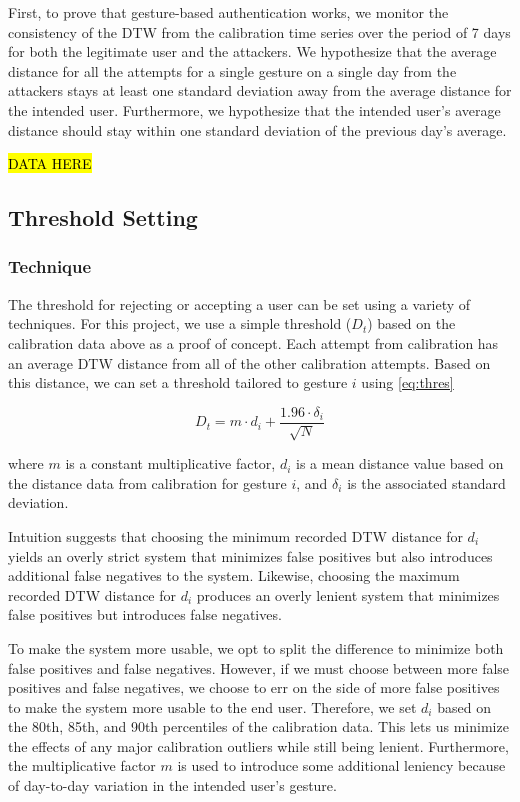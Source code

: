 First, to prove that gesture-based authentication works, we monitor the consistency of the \gls{DTW} from the calibration time series over the period of 7 days for both the legitimate user and the attackers. We hypothesize that the average distance for all the attempts for a single gesture on a single day from the attackers stays at least one standard deviation away from the average distance for the intended user. Furthermore, we hypothesize that the intended user's average distance should stay within one standard deviation of the previous day's average.

\hl{DATA HERE}

\subsection{Threshold Setting}

\subsubsection{Technique}

The threshold for rejecting or accepting a user can be set using a variety of techniques. For this project, we use a simple threshold ($D_{t}$) based on the calibration data above as a proof of concept. Each attempt from calibration has an average \gls{DTW} distance from all of the other calibration attempts. Based on this distance, we can set a threshold tailored to gesture $i$ using \autoref{eq:thres}

\begin{equation}
D_{t} = m \cdot d_{i} + \frac{1.96 \cdot \delta_{i}}  {\sqrt{N}}
\label{eq:thres}
\end{equation}

\noindent where $m$ is a constant multiplicative factor, $d_{i}$ is a mean distance value based on the distance data from calibration for gesture $i$, and $\delta_{i}$ is the associated standard deviation.

Intuition suggests that choosing the minimum recorded \gls{DTW} distance for $d_{i}$ yields an overly strict system that minimizes false positives but also introduces additional false negatives to the system. Likewise, choosing the maximum recorded \gls{DTW} distance for $d_{i}$ produces an overly lenient system that minimizes false positives but introduces false negatives. 

To make the system more usable, we opt to split the difference to minimize both false positives and false negatives. However, if we must choose between more false positives and false negatives, we choose to err on the side of more false positives to make the system more usable to the end user. Therefore, we set $d_{i}$ based on the 80th, 85th, and 90th percentiles of the calibration data. This lets us minimize the effects of any major calibration outliers while still being lenient. Furthermore, the multiplicative factor $m$ is used to introduce some additional leniency because of day-to-day variation in the intended user's gesture. 

